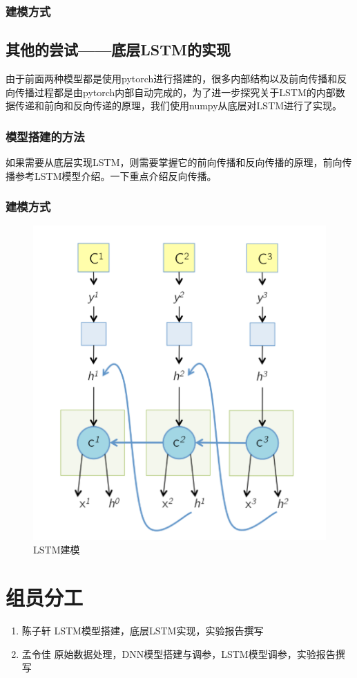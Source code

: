 \documentclass[UTF8]{ctexart}
\begin{document}
\subsubsection{建模方式}
\subsection{其他的尝试——底层LSTM的实现}
由于前面两种模型都是使用pytorch进行搭建的，很多内部结构以及前向传播和反向传播过程都是由pytorch内部自动完成的，为了进一步探究关于LSTM的内部数据传递和前向和反向传递的原理，我们使用numpy从底层对LSTM进行了实现。
\subsubsection{模型搭建的方法}
如果需要从底层实现LSTM，则需要掌握它的前向传播和反向传播的原理，前向传播参考LSTM模型介绍。一下重点介绍反向传播。
\subsubsection{建模方式}
\begin{figure}[!htbp]
    \centering
    \includegraphics[scale = 0.6]{p7.png}
    \caption{LSTM建模\cite{2}}
\end{figure}
\section{组员分工}
\begin{enumerate}
    \item 陈子轩 LSTM模型搭建，底层LSTM实现，实验报告撰写
    \item 孟令佳 原始数据处理，DNN模型搭建与调参，LSTM模型调参，实验报告撰写
\end{enumerate}
\end{document}
